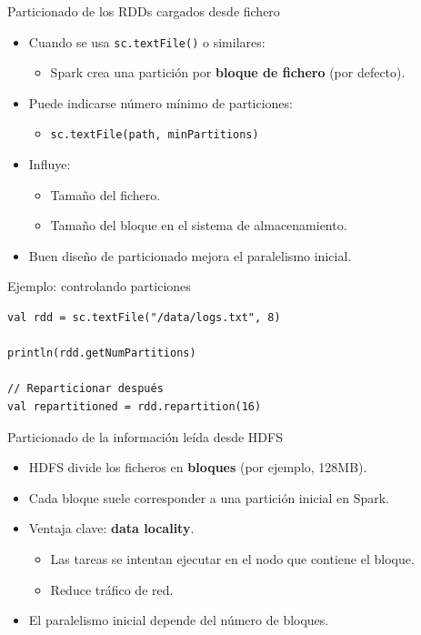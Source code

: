 \documentclass{beamer}
\begin{document}
\begin{frame}{Particionado de los RDDs cargados desde fichero}
\begin{itemize}
  \item Cuando se usa \texttt{sc.textFile()} o similares:
  \begin{itemize}
    \item Spark crea una partición por \textbf{bloque de fichero} (por defecto).
  \end{itemize}
  \item Puede indicarse número mínimo de particiones:
  \begin{itemize}
    \item \texttt{sc.textFile(path, minPartitions)}
  \end{itemize}
  \item Influye:
  \begin{itemize}
    \item Tamaño del fichero.
    \item Tamaño del bloque en el sistema de almacenamiento.
  \end{itemize}
  \item Buen diseño de particionado mejora el paralelismo inicial.
\end{itemize}
\end{frame}

\begin{frame}[fragile]{Ejemplo: controlando particiones}
\begin{verbatim}
val rdd = sc.textFile("/data/logs.txt", 8)

println(rdd.getNumPartitions)

// Reparticionar después
val repartitioned = rdd.repartition(16)
\end{verbatim}
\end{frame}

\begin{frame}{Particionado de la información leída desde HDFS}
\begin{itemize}
  \item HDFS divide los ficheros en \textbf{bloques} (por ejemplo, 128MB).
  \item Cada bloque suele corresponder a una partición inicial en Spark.
  \item Ventaja clave: \textbf{data locality}.
  \begin{itemize}
    \item Las tareas se intentan ejecutar en el nodo que contiene el bloque.
    \item Reduce tráfico de red.
  \end{itemize}
  \item El paralelismo inicial depende del número de bloques.
\end{itemize}
\end{frame}
\end{document}
